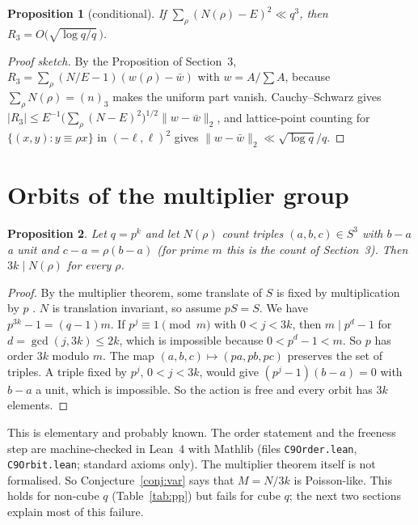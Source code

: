 \documentclass[11pt]{article}
\newtheorem{proposition}{Proposition}
\begin{document}
\begin{proposition}[conditional]
If $\sum_\rho(N(\rho)-E)^2\ll q^3$, then $R_3=O\bigl(\sqrt{\log q/q}\,\bigr)$.
\end{proposition}
\begin{proof}[Proof sketch]
By the Proposition of Section~3, $R_3=\sum_\rho(N/E-1)(w(\rho)-\bar w)$ with $w=A/\sum A$, because $\sum_\rho N(\rho)=(n)_3$ makes the
uniform part vanish. Cauchy--Schwarz gives $|R_3|\le E^{-1}\bigl(\sum_\rho(N-E)^2\bigr)^{1/2}\|w-\bar w\|_2$, and lattice-point counting
for $\{(x,y):y\equiv\rho x\}$ in $(-\ell,\ell)^2$ gives $\|w-\bar w\|_2\ll\sqrt{\log q}/q$.
\end{proof}

\section{Orbits of the multiplier group}\label{sec:orb}
\begin{proposition}\label{prop:orb}
Let $q=p^k$ and let $N(\rho)$ count triples $(a,b,c)\in S^3$ with $b-a$ a unit and $c-a=\rho(b-a)$ (for prime $m$ this is the count of Section~3).
Then $3k\mid N(\rho)$ for every $\rho$.
\end{proposition}
\begin{proof}
By the multiplier theorem, some translate of $S$ is fixed by multiplication by $p$ \cite{Ha,MR}. $N$ is translation invariant, so assume $pS=S$.
We have $p^{3k}-1=(q-1)m$. If $p^j\equiv1\pmod m$ with $0<j<3k$, then $m\mid p^d-1$ for $d=\gcd(j,3k)\le 2k$, which is impossible because $0<p^d-1<m$.
So $p$ has order $3k$ modulo $m$. The map $(a,b,c)\mapsto(pa,pb,pc)$ preserves the set of triples. A triple fixed by $p^j$, $0<j<3k$, would give
$(p^j-1)(b-a)=0$ with $b-a$ a unit, which is impossible. So the action is free and every orbit has $3k$ elements.
\end{proof}
This is elementary and probably known. The order statement and the freeness step are machine-checked in Lean~4 with Mathlib
(files \texttt{C9Order.lean}, \texttt{C9Orbit.lean}; standard axioms only). The multiplier theorem itself is not formalised.
So Conjecture~\ref{conj:var} says that $M=N/3k$ is Poisson-like. This holds for non-cube $q$ (Table~\ref{tab:pp}) but fails for cube $q$; the next two sections explain most of this failure.
\end{document}
